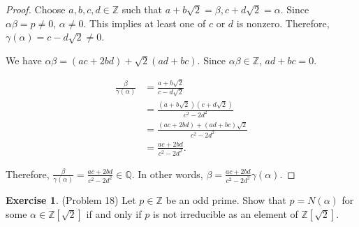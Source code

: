 \documentclass[12pt, psamsfonts]{amsart}
\theoremstyle{definition}
\newtheorem*{exer}{Exercise}
\theoremstyle{remark}
\numberwithin{equation}{section}
\begin{document}
\begin{proof}
  Choose $a, b, c, d \in \mathbb{Z}$ such that $a + b\sqrt{2} = \beta, c + d\sqrt{2} = \alpha$.
  Since $\alpha\beta = p \ne 0$, $\alpha \ne 0$.
  This implies at least one of $c$ or $d$ is nonzero.
  Therefore, $\gamma(\alpha) = c - d\sqrt{2} \ne 0$.

  We have $\alpha\beta = (ac + 2bd) + \sqrt{2}(ad + bc)$.
  Since $\alpha\beta \in \mathbb{Z}$, $ad + bc = 0$.

  \begin{align*}
    \frac{\beta}{\gamma(\alpha)}
      &= \frac{a + b\sqrt{2}}{c - d\sqrt{2}} \\
      &= \frac{(a + b\sqrt{2})(c + d\sqrt{2})}{c^2 - 2d^2} \\
      &= \frac{(ac + 2bd) + (ad + bc)\sqrt{2}}{c^2 - 2d^2} \\
      &= \frac{ac + 2bd}{c^2 - 2d^2}.
  \end{align*}

  Therefore, $\frac{\beta}{\gamma(\alpha)}  = \frac{ac + 2bd}{c^2 - 2d^2} \in \mathbb{Q}$.
  In other words, $\beta = \frac{ac + 2bd}{c^2 - 2d^2}\gamma(\alpha)$.
\end{proof}

\begin{exer}{(Problem 18)}
  Let $p \in \mathbb{Z}$ be an odd prime.
  Show that $p = N(\alpha)$ for some $\alpha \in \mathbb{Z}[\sqrt{2}]$ if and only if $p$ is not irreducible as an element of $\mathbb{Z}[\sqrt{2}]$.
\end{exer}
\end{document}
